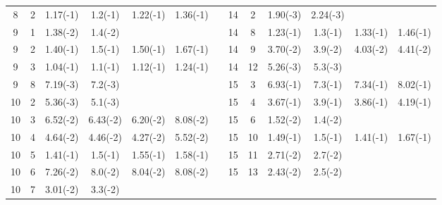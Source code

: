 \documentclass[useAMS,usenatbib]{mn2e}
\begin{document}
\begin{table}
\begin{tabular}{ccccccccccccc}
8  &          2 &   1.17(-1) & 1.2(-1)  & 1.22(-1) & 1.36(-1) &            &         14 &          2 &   1.90(-3) & 2.24(-3)&          &          \\
9  &          1 &   1.38(-2) & 1.4(-2)  &          &          &            &         14 &          8 &   1.23(-1) & 1.3(-1) & 1.33(-1) & 1.46(-1) \\
9  &          2 &   1.40(-1) & 1.5(-1)  & 1.50(-1) & 1.67(-1) &            &         14 &          9 &   3.70(-2) & 3.9(-2) & 4.03(-2) & 4.41(-2) \\
9  &          3 &   1.04(-1) & 1.1(-1)  & 1.12(-1) & 1.24(-1) &            &         14 &         12 &   5.26(-3) & 5.3(-3) &          &          \\
9  &          8 &   7.19(-3) & 7.2(-3)  &          &          &            &         15 &          3 &   6.93(-1) & 7.3(-1) & 7.34(-1) & 8.02(-1) \\
10 &          2 &   5.36(-3) & 5.1(-3)  &          &          &            &         15 &          4 &   3.67(-1) & 3.9(-1) & 3.86(-1) & 4.19(-1) \\
10 &          3 &   6.52(-2) & 6.43(-2) & 6.20(-2) & 8.08(-2) &            &         15 &          6 &   1.52(-2) & 1.4(-2) &          &          \\
10 &          4 &   4.64(-2) & 4.46(-2) & 4.27(-2) & 5.52(-2) &            &         15 &         10 &   1.49(-1) & 1.5(-1) & 1.41(-1) & 1.67(-1) \\
10 &          5 &   1.41(-1) & 1.5(-1)  & 1.55(-1) & 1.58(-1) &            &         15 &         11 &   2.71(-2) & 2.7(-2) &          &          \\
10 &          6 &   7.26(-2) & 8.0(-2)  & 8.04(-2) & 8.08(-2) &            &         15 &         13 &   2.43(-2) & 2.5(-2) &          &          \\
10 &          7 &   3.01(-2) & 3.3(-2)  &          &          &            &            &            &            &         &     &     \\
\hline
\end{tabular}
%
\label{Avalues2}
\end{table}



\clearpage
\end{document}
